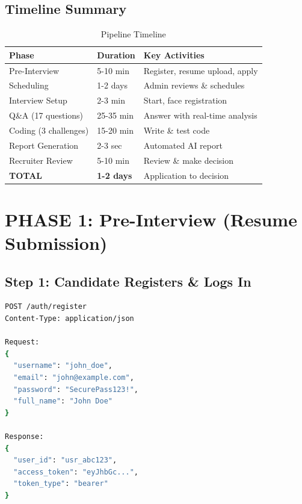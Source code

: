 \documentclass[12pt,a4paper]{article}
\begin{document}
\subsection{Timeline Summary}
\begin{table}[h!]
\centering
\begin{tabular}{|l|l|l|}
\hline
\textbf{Phase} & \textbf{Duration} & \textbf{Key Activities} \\
\hline
Pre-Interview & 5-10 min & Register, resume upload, apply \\
Scheduling & 1-2 days & Admin reviews \& schedules \\
Interview Setup & 2-3 min & Start, face registration \\
Q\&A (17 questions) & 25-35 min & Answer with real-time analysis \\
Coding (3 challenges) & 15-20 min & Write \& test code \\
Report Generation & 2-3 sec & Automated AI report \\
Recruiter Review & 5-10 min & Review \& make decision \\
\hline
\textbf{TOTAL} & \textbf{1-2 days} & Application to decision \\
\hline
\end{tabular}
\caption{Pipeline Timeline}
\end{table}

\newpage

\section{PHASE 1: Pre-Interview (Resume Submission)}

\subsection{Step 1: Candidate Registers \& Logs In}

\begin{lstlisting}[language=bash, caption=Registration API]
POST /auth/register
Content-Type: application/json

Request:
{
  "username": "john_doe",
  "email": "john@example.com",
  "password": "SecurePass123!",
  "full_name": "John Doe"
}

Response:
{
  "user_id": "usr_abc123",
  "access_token": "eyJhbGc...",
  "token_type": "bearer"
}
\end{lstlisting}
\end{document}
